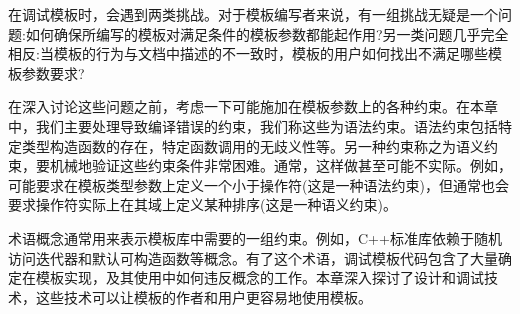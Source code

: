 在调试模板时，会遇到两类挑战。对于模板编写者来说，有一组挑战无疑是一个问题:如何确保所编写的模板对满足条件的模板参数都能起作用?另一类问题几乎完全相反:当模板的行为与文档中描述的不一致时，模板的用户如何找出不满足哪些模板参数要求?

在深入讨论这些问题之前，考虑一下可能施加在模板参数上的各种约束。在本章中，我们主要处理导致编译错误的约束，我们称这些为语法约束。语法约束包括特定类型构造函数的存在，特定函数调用的无歧义性等。另一种约束称之为语义约束，要机械地验证这些约束条件非常困难。通常，这样做甚至可能不实际。例如，可能要求在模板类型参数上定义一个小于操作符(这是一种语法约束)，但通常也会要求操作符实际上在其域上定义某种排序(这是一种语义约束)。

术语概念通常用来表示模板库中需要的一组约束。例如，C++标准库依赖于随机访问迭代器和默认可构造函数等概念。有了这个术语，调试模板代码包含了大量确定在模板实现，及其使用中如何违反概念的工作。本章深入探讨了设计和调试技术，这些技术可以让模板的作者和用户更容易地使用模板。
